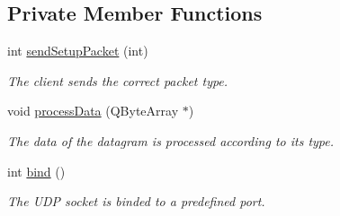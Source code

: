 \subsection*{Private Member Functions}
\begin{DoxyCompactItemize}
\item 
int \hyperlink{classClient_a2194fd34125d24363c4e7074ec3923b3}{sendSetupPacket} (int)
\begin{DoxyCompactList}\small\item\em The client sends the correct packet type. \item\end{DoxyCompactList}\item 
void \hyperlink{classClient_a449b9867ad67d835ca9cff7cf7262b0a}{processData} (QByteArray $\ast$)
\begin{DoxyCompactList}\small\item\em The data of the datagram is processed according to its type. \item\end{DoxyCompactList}\item 
\hypertarget{classClient_a491e832276880ef9cc629f6ae43eca82}{
int \hyperlink{classClient_a491e832276880ef9cc629f6ae43eca82}{bind} ()}
\label{classClient_a491e832276880ef9cc629f6ae43eca82}

\begin{DoxyCompactList}\small\item\em The UDP socket is binded to a predefined port. \item\end{DoxyCompactList}\end{DoxyCompactItemize}
